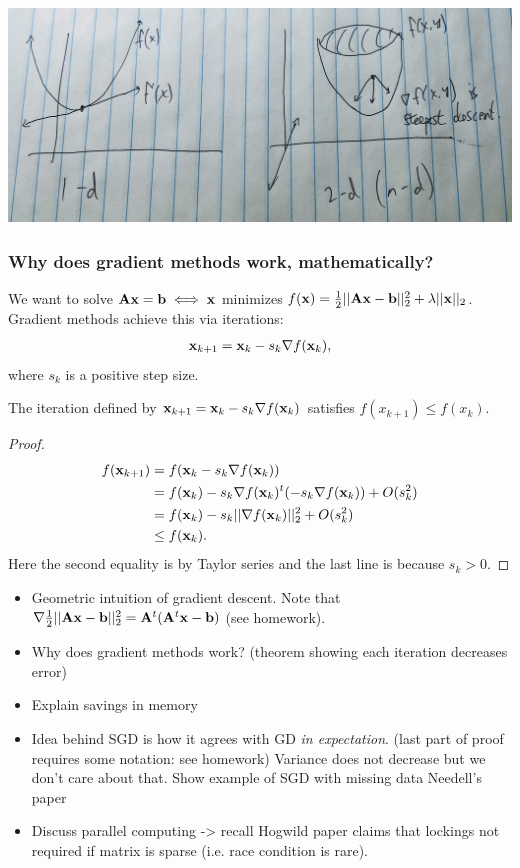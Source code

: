 \documentclass[./some_latex_template.tex]{subfiles}
\begin{document}
\begin{center}
	\includegraphics[scale=0.1]{gradient_illustration.jpg}
\end{center}

\subsubsection{Why does gradient methods work, mathematically?}

We want to solve $\mathbf{A}\mathbf{x} = \mathbf{b} \iff \mathbf{x}$ minimizes $f(\mathbf{x}) = \frac{1}{2}||\mathbf{A}\mathbf{x} - \mathbf{b}||^2_2 + \lambda||\mathbf{x}||_2$. Gradient methods achieve this via iterations:
\begin{align}\label{gradient_method_works}
	\mathbf{x}_{k + 1} = \mathbf{x}_k - s_k \nabla f(\mathbf{x}_k),
\end{align}
where $s_k$ is a positive step size. 

\begin{theorem}
	The iteration defined by $\mathbf{x}_{k + 1} = \mathbf{x}_k - s_k \nabla f(\mathbf{x}_k)$ satisfies $f(x_{k + 1}) \le f(x_k)$. 
\end{theorem}
\begin{proof}
	\begin{align*}
		f(\mathbf{x}_{k + 1}) 
		&= f(\mathbf{x}_k - s_k\nabla f(\mathbf{x}_k)) \\
		&= f(\mathbf{x}_k) - s_k\nabla f(\mathbf{x}_k)^t(-s_k \nabla f(\mathbf{x}_k)) + O(s_k^2)\\
		&= f(\mathbf{x}_k) - s_k ||\nabla f(\mathbf{x}_k)||_2^2 + O(s_k^2)\\
		&\le f(\mathbf{x}_k).
	\end{align*}
Here the second equality is by Taylor series and the last line is because $s_k > 0$. 
\end{proof}

\begin{itemize}
	\item Geometric intuition of gradient descent. Note that $\nabla \frac{1}{2}||\mathbf{A}\mathbf{x} - \mathbf{b}||_2^2 = \mathbf{A}^t(\mathbf{A}^t\mathbf{x} - \mathbf{b})$ (see homework).
	\item Why does gradient methods work? (theorem showing each iteration decreases error)
	\item Explain savings in memory
	\item Idea behind SGD is how it agrees with GD \textit{in expectation}. (last part of proof requires some notation: see homework) Variance does not decrease but we don't care about that. Show example of SGD with missing data Needell's paper
	\item Discuss parallel computing -> recall Hogwild paper claims that lockings not required if matrix is sparse (i.e. race condition is rare). 
\end{itemize}
\end{document}
